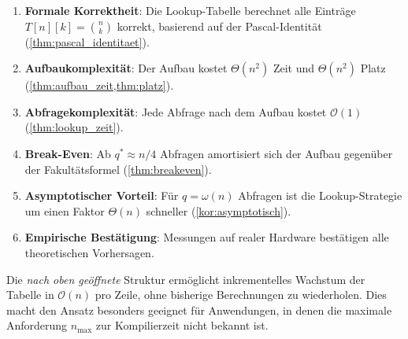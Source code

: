 ﻿\documentclass[12pt, a4paper]{article}
\newcommand{\Oh}{\mathcal{O}}
\theoremstyle{plain}
\theoremstyle{definition}
\theoremstyle{remark}
\renewcommand{\Oh}{\mathcal{O}}
\begin{document}
\begin{enumerate}[label=\textbf{(\arabic*)}]
  \item \textbf{Formale Korrektheit}: Die Lookup-Tabelle berechnet
        alle Einträge $T[n][k] = \binom{n}{k}$ korrekt, basierend auf
        der Pascal-Identität (\cref{thm:pascal_identitaet}).
  \item \textbf{Aufbaukomplexität}: Der Aufbau kostet $\Theta(n^2)$
        Zeit und $\Theta(n^2)$ Platz (\cref{thm:aufbau_zeit,thm:platz}).
  \item \textbf{Abfragekomplexität}: Jede Abfrage nach dem Aufbau
        kostet $\Oh(1)$ (\cref{thm:lookup_zeit}).
  \item \textbf{Break-Even}: Ab $q^* \approx n/4$ Abfragen amortisiert
        sich der Aufbau gegenüber der Fakultätsformel
        (\cref{thm:breakeven}).
  \item \textbf{Asymptotischer Vorteil}: Für $q = \omega(n)$ Abfragen
        ist die Lookup-Strategie um einen Faktor $\Theta(n)$ schneller
        (\cref{kor:asymptotisch}).
  \item \textbf{Empirische Bestätigung}: Messungen auf realer Hardware
        bestätigen alle theoretischen Vorhersagen.
\end{enumerate}

Die \emph{nach oben geöffnete} Struktur ermöglicht inkrementelles
Wachstum der Tabelle in $\Oh(n)$ pro Zeile, ohne bisherige Berechnungen
zu wiederholen. Dies macht den Ansatz besonders geeignet für
Anwendungen, in denen die maximale Anforderung $n_{\max}$ zur
Kompilierzeit nicht bekannt ist.
\end{document}
